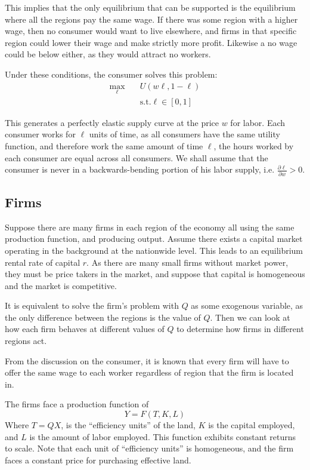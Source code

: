 \documentclass[12pt]{paper}
\begin{document}
This implies that the only equilibrium that can be supported is the
equilibrium where all the regions pay the same wage. If there
was some region with a higher wage, then no consumer would want to
live elsewhere, and firms in that specific region could lower
their wage and make strictly more profit. Likewise a no wage could be
below either, as they would attract no workers.

Under these conditions, the consumer solves this problem: 
\begin{align*}
  \max_\ell \quad& U( w \ell, 1 - \ell)\\
          &\text{s.t.} \ell \in [0,1]
\end{align*}

This generates a perfectly elastic supply curve at the price $w$ for
labor. Each consumer works for $\ell$ units of time, as all consumers
have the same utility function, and therefore work the same amount of
time $\ell$, the hours worked by each consumer are equal across all
consumers. We shall assume that the consumer is never in a
backwards-bending portion of his labor supply, i.e.
$\frac{\partial \ell}{\partial w} > 0$.


\subsection*{Firms}
Suppose there are many firms in each region of the economy all using
the same production function, and producing output. Assume there
exists a capital market operating in the background at the nationwide
level. This leads to an equilibrium rental rate of capital $r$. As
there are many small firms without market power, they must be price
takers in the market, and suppose that capital is homogeneous and the
market is competitive.

It is equivalent to solve the firm's problem with $Q$ as some
exogenous variable, as the only difference between the regions is the
value of $Q$. Then we can look at how each firm behaves at different
values of $Q$ to determine how firms in different regions act.

From the discussion on the consumer, it is known that every firm will
have to offer the same wage to each worker regardless of region that
the firm is located in.

The firms face a production function of
\begin{equation*}
  Y = F( T, K, L)
\end{equation*}
Where $T = QX$, is the ``efficiency units'' of the land, $K$ is the
capital employed, and $L$ is the amount of labor employed.
This function exhibits constant returns to scale. Note that each unit
of ``efficiency units'' is homogeneous, and the firm faces a constant
price for purchasing effective land.
\end{document}
